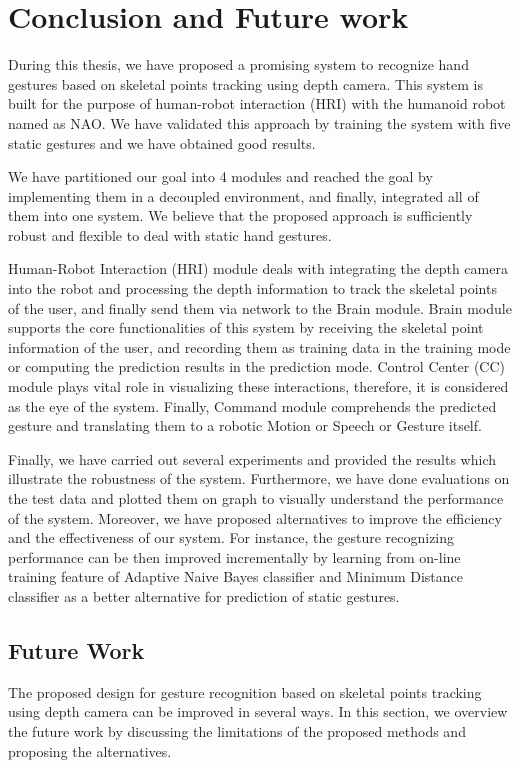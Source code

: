 \chapter{Conclusion and Future work}
During this thesis, we have proposed a promising system to recognize hand gestures based on skeletal points tracking using depth camera. This system is built for the purpose of human-robot interaction (HRI) with the humanoid robot named as NAO. We have validated this approach by training the system with five static gestures and we have obtained good results. 

We have partitioned our goal into 4 modules and reached the goal by implementing them in a decoupled environment, and finally, integrated all of them into one system. We believe that the proposed approach is sufficiently robust and flexible to deal with static hand gestures. 

Human-Robot Interaction (HRI) module deals with integrating the depth camera into the robot and processing the depth information to track the skeletal points of the user, and finally send them via network to the Brain module. Brain module supports the core functionalities of this system by receiving the skeletal point information of the user, and recording them as training data in the training mode or computing the prediction results in the prediction mode. Control Center (CC) module plays vital role in visualizing these interactions, therefore, it is considered as the eye of the system. Finally, Command module comprehends the predicted gesture and translating them to a robotic Motion or Speech or Gesture itself.

Finally, we have carried out several experiments and provided the results which illustrate the robustness of the system. Furthermore, we have done evaluations on the test data and plotted them on graph to visually understand the performance of the system. Moreover, we have proposed alternatives to improve the efficiency and the effectiveness of our system. For instance, the gesture recognizing performance can be then improved incrementally by learning from on-line training feature of Adaptive Naive Bayes classifier and Minimum Distance classifier as a better alternative for prediction of static gestures.
 
\section{Future Work}
The proposed design for gesture recognition based on skeletal points tracking using depth camera can be improved in several ways. In this section, we overview the future work by discussing the limitations of the proposed methods and proposing the alternatives.

